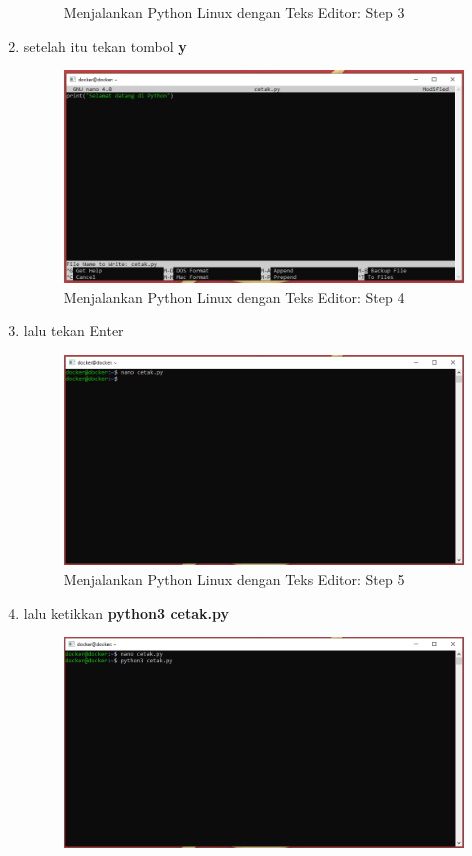 \begin{enumerate}
\begin{figure}[H]
        \caption{Menjalankan Python Linux dengan Teks Editor: Step 3}
\end{figure}
\item setelah itu tekan tombol \textbf{y}
\begin{figure}[H]
        \centerline{\includegraphics[scale=0.5]{figures/menjalankan-python-linux-with-nano/step4}}
        \caption{Menjalankan Python Linux dengan Teks Editor: Step 4}
\end{figure}
\item lalu tekan Enter
\begin{figure}[H]
        \centerline{\includegraphics[scale=0.5]{figures/menjalankan-python-linux-with-nano/step5}}
        \caption{Menjalankan Python Linux dengan Teks Editor: Step 5}
\end{figure}
\item lalu ketikkan \textbf{python3 cetak.py}
\begin{figure}[H]
        \centerline{\includegraphics[scale=0.5]{figures/menjalankan-python-linux-with-nano/step6}}

\end{figure}
\end{enumerate}
